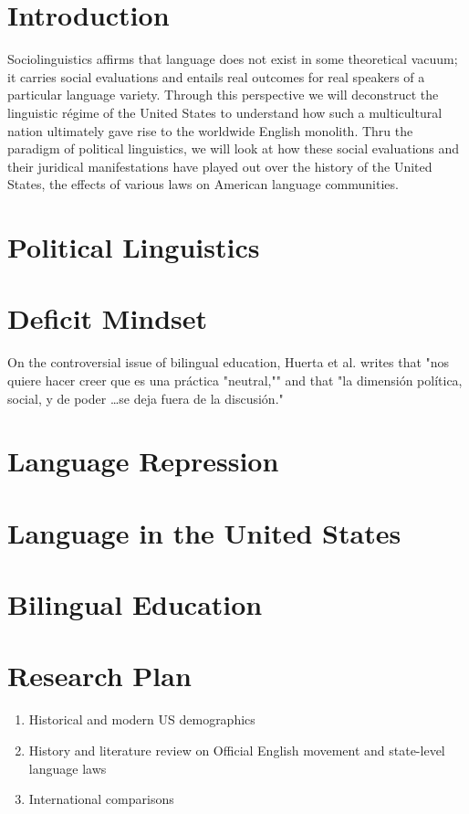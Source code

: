 \documentclass{article}
\begin{document}
\section*{Introduction}

Sociolinguistics affirms that language does not exist in some theoretical
vacuum; it carries social evaluations and entails real outcomes for real
speakers of a particular language variety. Through this perspective we will
deconstruct the linguistic régime of the United States to understand how such a
multicultural nation ultimately gave rise to the worldwide English monolith.
Thru the paradigm of political linguistics, we will look at how these social
evaluations and their juridical manifestations have played out over the history
of the United States, the effects of various laws on American language
communities.

\section*{Political Linguistics}


\section*{Deficit Mindset}

On the controversial issue of bilingual education, Huerta et al. writes that
"nos quiere hacer creer que es una práctica "neutral,"" and that "la dimensión
política, social, y de poder \ldots se deja fuera de la discusión."


\section*{Language Repression}

\section*{Language in the United States}


\section*{Bilingual Education}

\section*{Research Plan}

\begin{enumerate}
\item Historical and modern US demographics
\item History and literature review on Official English movement and state-level
language laws
\item International comparisons
\end{enumerate}
\end{document}
